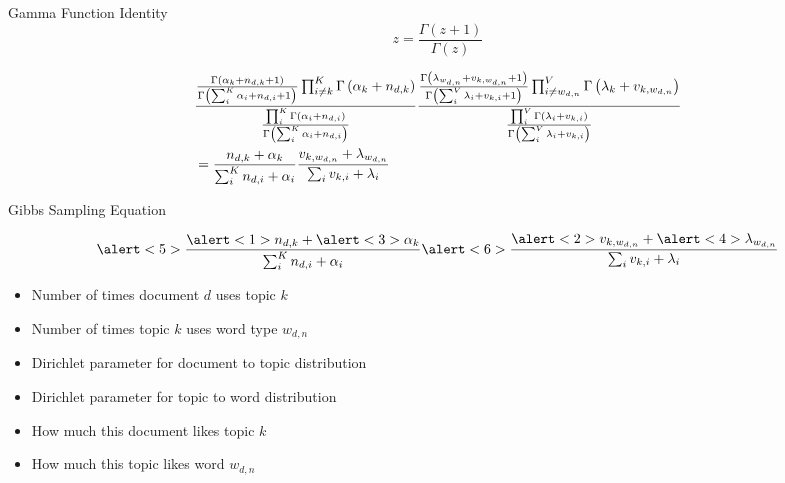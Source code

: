 \begin{frame}

\begin{block}{Gamma Function Identity}
	\begin{equation}
		z = \frac{\Gamma(z + 1)}{\Gamma(z)}
	\end{equation}
\end{block}

\begin{footnotesize}
\begin{align*}
& \frac{
  \dirnum{i \not = k}{K}{\alpha_k + n_{d,k} + 1}{ \g{\sum_{i}^{K} \alpha_i +
      n_{d,i} + 1} } \g{\alpha_k + n_{d,k}}  }
{ \dirfunc{i}{K}{\alpha_i + n_{d,i}} }
\frac{
 \dirnum{i \not = w_{d,n}}{V}{\lambda_{w_{d,n}} + v_{k,w_{d,n}} + 1}{ \g{\sum_{i}^{V} \lambda_i + v_{k,i} + 1} } \g{\lambda_k + v_{k,w_{d,n}}}
}{ \dirfunc{i}{V}{\lambda_i + v_{k,i}} } \\
& = \frac{n_{d, k} + \alpha_k}{ \sum_{i}^{K} { n_{d,i} + \alpha_i}} \frac{v_{k, w_{d,n}} + \lambda_{w_{d,n}}}{ \sum_{i} { v_{k,i} + \lambda_{i} }}
\end{align*}
\end{footnotesize}

\end{frame}
\else
\fi

\begin{frame}{Gibbs Sampling Equation}
  
\begin{equation}
\alert<5>{\frac{\alert<1>{n_{d, k}} +  \alert<3>{\alpha_k}}{ \sum_{i}^{K} { n_{d,i} +\alpha_i}}} \alert<6>{\frac{\alert<2>{v_{k, w_{d,n}}} + \alert<4>{\lambda_{w_{d,n}}}}{ \sum_{i} { v_{k,i} + \lambda_{i} }}}
\end{equation}

\begin{itemize}
  \item \alert<1>{Number of times document $d$ uses topic $k$}
  \item \alert<2>{Number of times topic $k$ uses word type $w_{d,n}$}
  \item \alert<3>{Dirichlet parameter for document to topic
      distribution}
  \item \alert<4>{Dirichlet parameter for topic to word distribution}
  \item \alert<5>{How much this document likes topic $k$}
  \item \alert<6>{How much this topic likes word $w_{d,n}$}
\end{itemize}

\end{frame}

